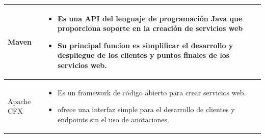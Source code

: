 \newpage
\begin{table}[b!]
\centering
\begin{tabular}{|p{2cm}|ll}
        \hline
          \multicolumn{1}{|p{5cm}|}{Maven}& 
          \multicolumn{1}{p{10cm}|}{
          \begin{itemize}
          \vspace{5mm}
          \item Es una API del lenguaje de programación Java que proporciona soporte en la creación de servicios web 
          \item Su principal funcion es  simplificar el desarrollo y despliegue de los clientes y puntos finales de los servicios web.
      \end{itemize}} \\
\hline
            \multicolumn{1}{|p{5cm}|}{Apache CFX}& 
          \multicolumn{1}{p{10cm}|}{
          \begin{itemize}
          \vspace{10mm}
           \item Es un framework de código abierto para crear servicios web.           
        \item ofrece una interfaz simple para el desarrollo de clientes y endpoints sin el uso de anotaciones.
      \end{itemize}} \\
      \hline
      \end{tabular}
    \end{table}

   

